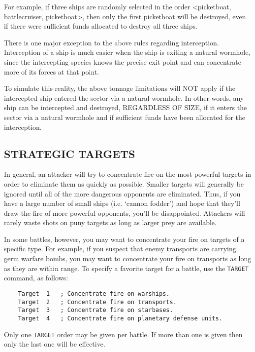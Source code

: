 \documentclass[10pt,titlepage]{article}
\begin{document}
For example, if three ships are randomly selected in the order <picketboat,
battlecruiser, picketboat>, then only the first picketboat will be destroyed,
even if there were sufficient funds allocated to destroy all three ships.

There is one major exception to the above rules regarding interception.
Interception of a ship is much easier when the ship is exiting a natural
wormhole, since the intercepting species knows the precise exit point and
can concentrate more of its forces at that point.

To simulate this reality, the above tonnage limitations will NOT apply if the
intercepted ship entered the sector via a natural wormhole.  In other words,
any ship can be intercepted and destroyed, REGARDLESS OF SIZE, if it enters the
sector via a natural wormhole and if sufficient funds have been allocated for
the interception.


\subsection{STRATEGIC TARGETS}
\label{sec:strategictargets}


In general, an attacker will try to concentrate fire on the most powerful
targets in order to eliminate them as quickly as possible.  Smaller targets
will generally be ignored until all of the more dangerous opponents are
eliminated.  Thus, if you have a large number of small ships (i.e. `cannon
fodder') and hope that they'll draw the fire of more powerful opponents, you'll
be disappointed.  Attackers will rarely waste shots on puny targets as long as
larger prey are available.

In some battles, however, you may want to concentrate your fire on targets of a
specific type.  For example, if you suspect that enemy transports are carrying
germ warfare bombs, you may want to concentrate your fire on transports as long
as they are within range.  To specify a favorite target for a battle, use the
\texttt{TARGET} command, as follows:

\begin{verbatim}
	Target	1	; Concentrate fire on warships.
	Target	2	; Concentrate fire on transports.
	Target	3	; Concentrate fire on starbases.
	Target	4	; Concentrate fire on planetary defense units.
\end{verbatim} 

Only one \texttt{TARGET} order may be given per battle.  If more than one is given then
only the last one will be effective.
\end{document}
